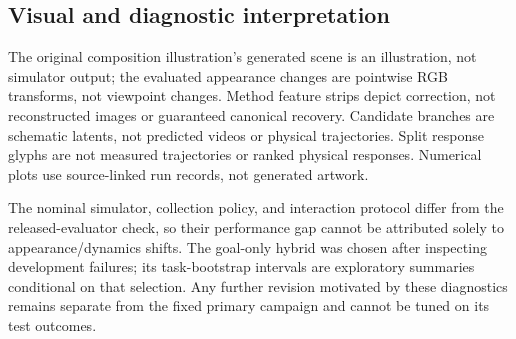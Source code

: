 \subsection{Visual and diagnostic interpretation}
The original composition illustration's generated scene is an illustration, not simulator output;
the evaluated appearance changes are pointwise RGB transforms, not viewpoint
changes. Method feature strips depict correction, not reconstructed images
or guaranteed canonical recovery. Candidate branches are schematic latents,
not predicted videos or physical trajectories. Split response glyphs are not
measured trajectories or ranked physical responses. Numerical plots use
source-linked run records, not generated artwork.

The nominal simulator, collection policy, and interaction protocol differ
from the released-evaluator check, so their performance gap cannot be
attributed solely to appearance/dynamics shifts. The goal-only hybrid was
chosen after inspecting development failures; its task-bootstrap intervals
are exploratory summaries conditional on that selection. Any further
revision motivated by these diagnostics remains separate from the fixed
primary campaign and cannot be tuned on its test outcomes.

